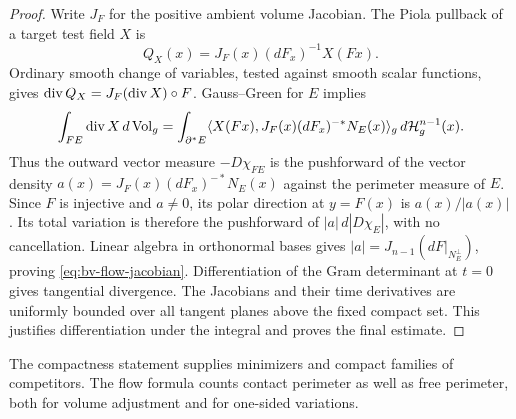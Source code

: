 \begin{proof}
Write $J_F$ for the positive ambient volume Jacobian. The Piola
pullback of a target test field $X$ is
\[
 Q_X(x)=J_F(x)(dF_x)^{-1}X(Fx).
\]
Ordinary smooth change of variables, tested against smooth scalar
functions, gives
$\operatorname{div} Q_X=J_F(\operatorname{div} X)\circ F$. Gauss--Green for $E$ implies
\[
 \int_{FE}\operatorname{div} X\,d\operatorname{Vol}_g
 =\int_{\partial^*E}
 \langle X(Fx),J_F(x)(dF_x)^{-*}N_E(x)\rangle_g
 \,d\mathcal H_g^{n-1}(x).
\]
Thus the outward vector measure $-D\chi_{FE}$ is the pushforward of
the vector density $a(x)=J_F(x)(dF_x)^{-*}N_E(x)$ against the
perimeter measure of $E$. Since $F$ is injective and $a\ne0$, its
polar direction at $y=F(x)$ is $a(x)/|a(x)|$. Its total variation is
therefore the pushforward of $|a|\,d|D\chi_E|$, with no cancellation.
Linear algebra in orthonormal bases gives
$|a|=J_{n-1}(dF|_{N_E^\perp})$, proving
\eqref{eq:bv-flow-jacobian}. Differentiation of the Gram determinant
at $t=0$ gives tangential divergence. The Jacobians and their time
derivatives are uniformly bounded over all tangent planes above the
fixed compact set. This justifies differentiation under the integral
and proves the final estimate.
\end{proof}

The compactness statement supplies minimizers and compact families of
competitors. The flow formula counts contact perimeter as well as free
perimeter, both for volume adjustment and for one-sided variations.
